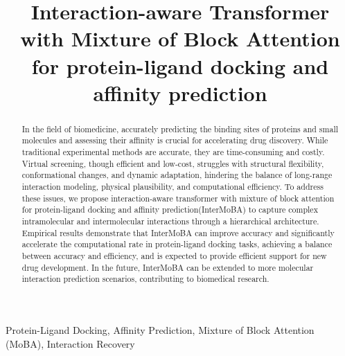 \documentclass[lettersize,journal]{IEEEtran}
\begin{document}
\title{Interaction-aware Transformer with Mixture of Block Attention for protein-ligand docking and affinity prediction\\
{\footnotesize }
}

\maketitle

\begin{abstract}
In the field of biomedicine, accurately predicting the binding sites of proteins and small molecules and assessing their affinity is crucial for accelerating drug discovery. While traditional experimental methods are accurate, they are time-consuming and costly. Virtual screening, though efficient and low-cost, struggles with structural flexibility, conformational changes, and dynamic adaptation, hindering the balance of long-range interaction modeling, physical plausibility, and computational efficiency. To address these issues, we propose interaction-aware transformer with mixture of block attention for protein-ligand docking and affinity prediction(InterMoBA) to capture complex intramolecular and intermolecular interactions through a hierarchical architecture. Empirical results demonstrate that InterMoBA can improve accuracy and significantly accelerate the computational rate in protein-ligand docking tasks, achieving a balance between accuracy and efficiency, and is expected to provide efficient support for new drug development. In the future, InterMoBA can be extended to more molecular interaction prediction scenarios, contributing to biomedical research.
\end{abstract}

\begin{IEEEkeywords}
Protein-Ligand Docking, Affinity Prediction, Mixture of Block Attention (MoBA), Interaction Recovery
\end{IEEEkeywords}
\end{document}

